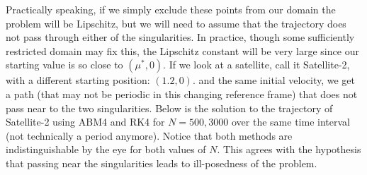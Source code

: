 \documentclass[final,oneside,onecolumn]{article}
\begin{document}
\begin{enumerate}
\begin{enumerate}
Practically speaking, if we simply exclude these points from our domain the problem will be Lipschitz, but we will need to assume that the trajectory does not pass through either of the singularities. In practice, though some sufficiently restricted domain may fix this, the Lipschitz constant will be very large since our starting value is so close to $(\mu^*,0)$. If we look at a satellite, call it Satellite-2, with a different starting position: $(1.2, 0)$. and the same initial velocity, we get a path (that may not be periodic in this changing reference frame) that does not pass near to the two singularities. Below is the solution to the trajectory of Satellite-2 using ABM4 and RK4 for $N=500, 3000$ over the same time interval (not technically a period anymore). Notice that both methods are indistinguishable by the eye for both values of $N$. This agrees with the hypothesis that passing near the singularities leads to ill-posedness of the problem.
\begin{figure}[H]
	\centering
\end{figure}

   
\end{enumerate}


\end{enumerate}
\end{document}
